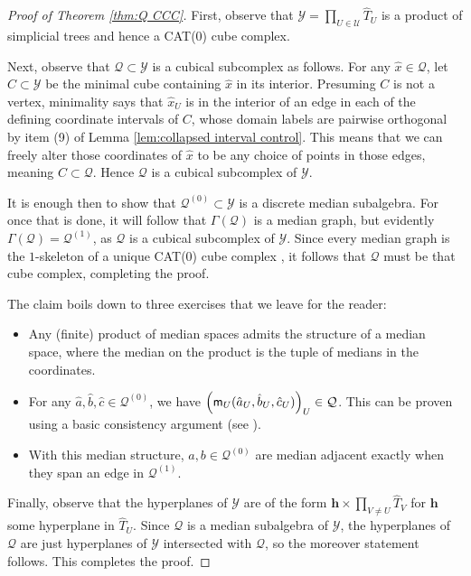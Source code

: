 \documentclass{amsart}
\theoremstyle{definition}
\theoremstyle{remark}
\theoremstyle{definition}
\newcommand{\hh}{{\sf h}}
\newcommand{\mm}{{\sf m}}
\newcommand{\calQ}{\mathcal{Q}}
\newcommand{\calU}{\mathcal{U}}
\newcommand{\calY}{\mathcal{Y}}
\newcommand{\hT}{\widehat{T}}
\newcommand{\hx}{\hat{x}}
\newcommand{\ha}{\hat{a}}
\newcommand{\hb}{\hat{b}}
\newcommand{\hc}{\hat{c}}
\renewcommand{\hh}{\mathbf{h}}
\begin{document}
\begin{proof}[Proof of Theorem \ref{thm:Q CCC}]
   First, observe that $\calY = \prod_{U \in \calU} \hT_U$ is a product of simplicial trees and hence a CAT(0) cube complex.
   
   Next, observe that $\calQ \subset \calY$ is a cubical subcomplex as follows.  For any $\hx \in \calQ$, let $C \subset \calY$ be the minimal cube containing $\hx$ in its interior.  Presuming $C$ is not a vertex, minimality says that $\hx_U$ is in the interior of an edge in each of the defining coordinate intervals of $C$, whose domain labels are pairwise orthogonal by item (9) of Lemma \ref{lem:collapsed interval control}.  This means that we can freely alter those coordinates of $\hx$ to be any choice of points in those edges, meaning $C \subset \calQ$.  Hence $\calQ$ is a cubical subcomplex of $\calY$.

   It is enough then to show that $\calQ^{(0)} \subset \calY$ is a discrete median subalgebra.  For once that is done, it will follow that $\Gamma(\calQ)$ is a median graph, but evidently $\Gamma(\calQ) = \calQ^{(1)}$, as $\calQ$ is a cubical subcomplex of $\calY$.  Since every median graph is the $1$-skeleton of a unique CAT(0) cube complex \cite[Theorem 6.1]{Che00}, it follows that $\calQ$ must be that cube complex, completing the proof.

   The claim boils down to three exercises that we leave for the reader:
   \begin{itemize}
       \item Any (finite) product of median spaces admits the structure of a median space, where the median on the product is the tuple of medians in the coordinates.
       \item For any $\ha,\hb,\hc \in \calQ^{(0)}$, we have $\left(\mm_U(\ha_U,\hb_U,\hc_U)\right)_U \in \calQ$.  This can be proven using a basic consistency argument (see \cite[Lemma 15.12]{Dur_infcube}).
       \item With this median structure, $a,b \in \calQ^{(0)}$ are median adjacent exactly when they span an edge in $\calQ^{(1)}$.
   \end{itemize}

   Finally, observe that the hyperplanes of $\calY$ are of the form $\hh \times \prod_{V\neq U} \hT_V$ for $\hh$ some hyperplane in $\hT_U$.  Since $\calQ$ is a median subalgebra of $\calY$, the hyperplanes of $\calQ$ are just hyperplanes of $\calY$ intersected with $\calQ$, so the moreover statement follows.  This completes the proof.
\end{proof}
\end{document}
